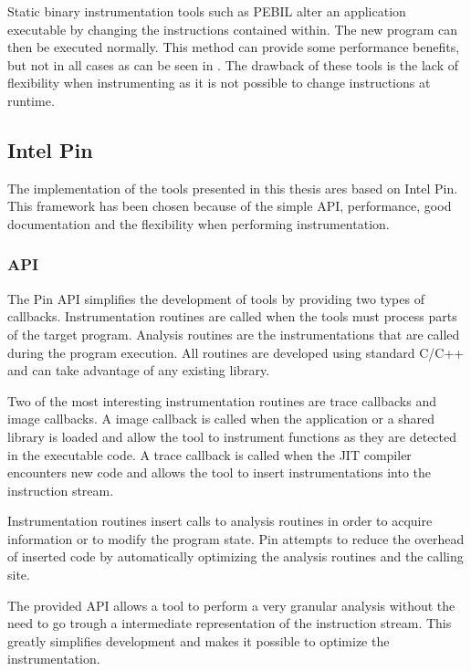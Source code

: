 Static binary instrumentation tools such as PEBIL \cite{pebil} alter an application executable by changing the instructions contained within. The new program can then be executed normally. This method can provide some performance benefits, but not in all cases as can be seen in \cite{pebilperf}. The drawback of these tools is the lack of flexibility when instrumenting as it is not possible to change instructions at runtime.

\subsection{Intel Pin}

The implementation of the tools presented in this thesis ares based on Intel Pin. This framework has been chosen because of the simple API, performance, good documentation and the flexibility when performing instrumentation.

\subsubsection{API}

The Pin API \cite{pindoc} simplifies the development of tools by providing two types of callbacks. Instrumentation routines are called when the tools must process parts of the target program. Analysis routines are the instrumentations that are called during the program execution. All routines are developed using standard C/C++ and can take advantage of any existing library.

Two of the most interesting instrumentation routines are trace callbacks and image callbacks. A image callback is called when the application or a shared library is loaded and allow the tool to instrument functions as they are detected in the executable code. A trace callback is called when the JIT compiler encounters new code and allows the tool to insert instrumentations into the instruction stream.

Instrumentation routines insert calls to analysis routines in order to acquire information or to modify the program state. Pin attempts to reduce the overhead of inserted code by automatically optimizing the analysis routines and the calling site.

The provided API allows a tool to perform a very granular analysis without the need to go trough a intermediate representation of the instruction stream. This greatly simplifies development and makes it possible to optimize the instrumentation.

